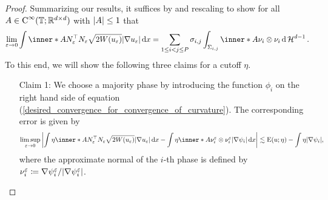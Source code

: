 \begin{proof}
	Summarizing our results, it suffices by  and rescaling to show for all $ A \in \operatorname{C}^{ \infty } ( \operatorname{\mathbb{T}} ; \mathbb{ R }^{ d \times d } ) $ with $ \abs{ A } \leq 1 $ that
	\begin{equation}
		\label{desired_convergence_for_convergence_of_curvature}
		\lim_{ \varepsilon \to 0 }
			\int
				\inner*{ A }{ N_{ \varepsilon }^{ \top } N_{ \varepsilon } }
				\sqrt{ 2 W ( u_{ \varepsilon } ) }
				\abs{ \nabla u_{ \varepsilon } }
			\dd{ x }
		=
		\sum_{ 1 \leq i < j \leq P }
			\sigma_{ i , j }
			\int_{ \Sigma_{ i , j } }
				\inner*{ A }{ \nu_{ i } \otimes \nu_{ i } }
			\dd{ \hm^{ d - 1 } }.
	\end{equation}
	To this end, we will show the following three claims for a cutoff $ \eta $.
	\begin{itemize}[wide=0pt]
		\item[Claim 1:]
		We choose a majority phase by introducing the function $ \phi_{ i } $ on the right hand side of equation (\ref{desired_convergence_for_convergence_of_curvature}). The corresponding error is given by
		\begin{equation*}
			\limsup_{ \varepsilon \to 0 }
				\abs{ 
					\int
						\eta 
						\inner*{ A }{ N_{ \varepsilon }^{ \top } N_{ \varepsilon } }
						\sqrt{ 2 W ( u_{ \varepsilon } ) } \abs{ \nabla u_{ \varepsilon } } 
					\dd{ x }
					-
					\int
						\eta
						\inner*{ A }{ \nu_{ i }^{ \varepsilon } \otimes \nu_{ i }^{ \varepsilon } }
						\abs{ \nabla \psi_{ i } }
					\dd{ x }
				}
			\lesssim
				\energy ( u ; \eta ) 
				-
				\int
					\eta
				\abs{ \nabla \psi_{ i } },
		\end{equation*}
		where the approximate normal of the $ i$-th phase is defined by $ \nu_{ i }^{ \varepsilon } \coloneqq \nabla \psi_{ i }^{ \varepsilon } / \abs{ \nabla \psi_{ i }^{ \varepsilon } } $.
		

\end{itemize}
\end{proof}
